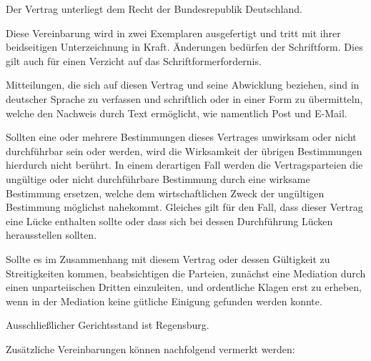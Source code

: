 \documentclass[article, 11pt,a4paper, titlepage, parskip=half, bibliography=totocnumbered]{scrreprt}
\begin{document}
\begin{contract}
		
		
		Der Vertrag unterliegt dem Recht der Bundesrepublik Deutschland.
		
		Diese Vereinbarung wird in zwei Exemplaren ausgefertigt und tritt mit ihrer beidseitigen Unterzeichnung in Kraft. Änderungen bedürfen der Schriftform. Dies gilt auch für einen Verzicht auf das Schriftformerfordernis.
		
		Mitteilungen, die sich auf diesen Vertrag und seine Abwicklung beziehen, sind in deutscher Sprache zu verfassen und schriftlich oder in einer Form zu übermitteln, welche den Nachweis durch Text ermöglicht, wie namentlich Post und E-Mail.
		
		
		
		
		Sollten eine oder mehrere Bestimmungen dieses Vertrages unwirksam oder nicht durchführbar sein oder werden, wird die Wirksamkeit der übrigen Bestimmungen hierdurch nicht berührt. In einem derartigen Fall werden die Vertragsparteien die ungültige oder nicht durchführbare Bestimmung durch eine wirksame Bestimmung ersetzen, welche dem wirtschaftlichen Zweck der ungültigen Bestimmung möglichst nahekommt. Gleiches gilt für den Fall, dass dieser Vertrag eine Lücke enthalten sollte oder dass sich bei dessen Durchführung Lücken herausstellen sollten.
		
		
		
		Sollte es im Zusammenhang mit diesem Vertrag oder dessen Gültigkeit zu Streitigkeiten kommen, beabsichtigen die Parteien, zunächst eine Mediation durch einen unparteiischen Dritten einzuleiten, und ordentliche Klagen erst zu erheben, wenn in der Mediation keine gütliche Einigung gefunden werden konnte.
		
		Ausschließlicher Gerichtsstand ist Regensburg.

		Zusätzliche Vereinbarungen können nachfolgend vermerkt werden: \\
		\newpage
		
		\parnumberfalse
		

\end{contract}
\end{document}
